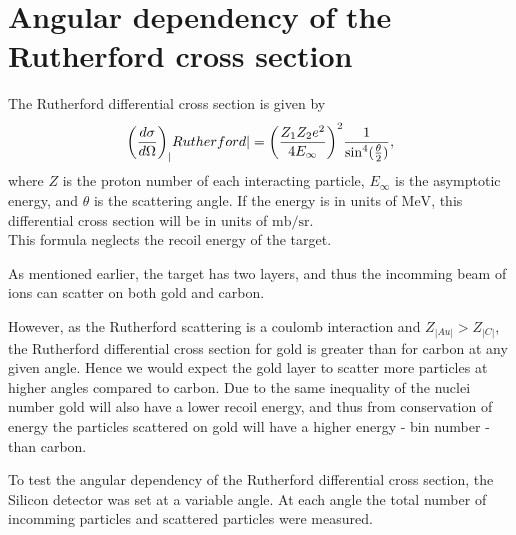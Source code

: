 \section{Angular dependency of the Rutherford cross section}
The Rutherford differential cross section \parencite[p. 16]{noteBB} is given by
\begin{align}\label{eq:cross}
    {\left( \diff[d]{\sigma}{\Omega} \right)}_|Rutherford| =
    {\left(\frac{Z_1Z_2 e^2}{4E_{\infty}} \right)}^2
    \frac{1}{{{\sin}^4(\frac{\theta}{2})}},
\end{align}
where $Z$ is the proton number of each interacting particle, $E_{\infty}$ is
the asymptotic energy, and $\theta$ is the scattering angle. If the energy is
in units of $\si{\mega\electronvolt}$, this differential cross section will be in units
of $\si{\milli\barn\per\steradian}$.\\
This formula neglects the recoil energy of the target. 

As mentioned earlier, the target has two layers, and thus the incomming beam of
ions can scatter on both gold and carbon. 

However, as the Rutherford scattering is a coulomb interaction and $Z_|Au| >
Z_|C|$, the Rutherford differential cross section for gold is greater than for carbon at any given angle. Hence we would expect the gold layer to scatter more particles at higher angles compared to carbon. Due to the same inequality of the nuclei number gold will also have a lower recoil energy, and thus from conservation of energy the particles scattered on gold will have a higher energy - bin number - than carbon.



To test the angular dependency of the Rutherford differential cross section,
the Silicon detector was set at a variable angle. At each angle the total
number of incomming particles and scattered particles were measured.\\

